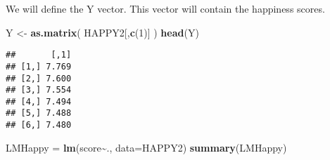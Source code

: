 \documentclass[
]{article}
\newenvironment{Shaded}{\begin{snugshade}}{\end{snugshade}}
\newcommand{\AttributeTok}[1]{\textcolor[rgb]{0.13,0.29,0.53}{#1}}
\newcommand{\DecValTok}[1]{\textcolor[rgb]{0.00,0.00,0.81}{#1}}
\newcommand{\FunctionTok}[1]{\textcolor[rgb]{0.13,0.29,0.53}{\textbf{#1}}}
\newcommand{\NormalTok}[1]{#1}
\newcommand{\OtherTok}[1]{\textcolor[rgb]{0.56,0.35,0.01}{#1}}
\newcommand{\SpecialCharTok}[1]{\textcolor[rgb]{0.81,0.36,0.00}{\textbf{#1}}}
\begin{document}
We will define the Y vector. This vector will contain the happiness
scores.

\begin{Shaded}
\begin{Highlighting}[]
\NormalTok{Y }\OtherTok{\textless{}{-}} \FunctionTok{as.matrix}\NormalTok{( HAPPY2[,}\FunctionTok{c}\NormalTok{(}\DecValTok{1}\NormalTok{)] )}
\FunctionTok{head}\NormalTok{(Y)}
\end{Highlighting}
\end{Shaded}

\begin{verbatim}
##       [,1]
## [1,] 7.769
## [2,] 7.600
## [3,] 7.554
## [4,] 7.494
## [5,] 7.488
## [6,] 7.480
\end{verbatim}

\begin{Shaded}
\begin{Highlighting}[]
\NormalTok{LMHappy }\OtherTok{=} \FunctionTok{lm}\NormalTok{(score}\SpecialCharTok{\textasciitilde{}}\NormalTok{., }\AttributeTok{data=}\NormalTok{HAPPY2)}
\FunctionTok{summary}\NormalTok{(LMHappy)}
\end{Highlighting}
\end{Shaded}
\end{document}
